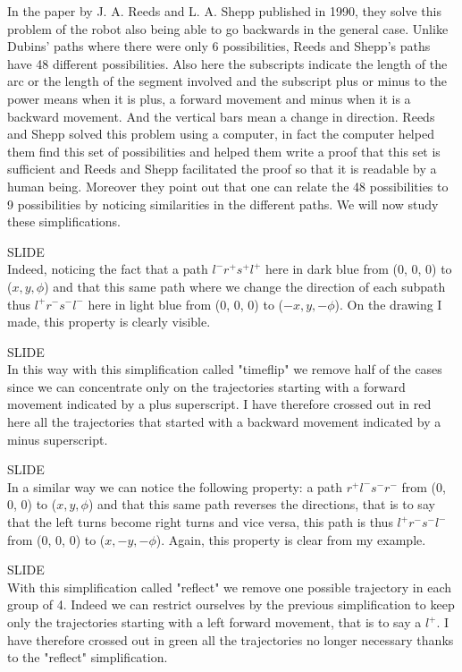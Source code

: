 \documentclass[12pt,a4paper]{article}
\newcommand{\slide}{\vspace{0.6cm}SLIDE\\}
\begin{document}
	In the paper by J. A. Reeds and L. A. Shepp published in 1990, they solve this problem of the robot also being able to go backwards in the general case. Unlike Dubins' paths where there were only 6 possibilities, Reeds and Shepp's paths have 48 different possibilities. Also here the subscripts indicate the length of the arc or the length of the segment involved and the subscript plus or minus to the power means when it is plus, a forward movement and minus when it is a backward movement. And the vertical bars mean a change in direction. Reeds and Shepp solved this problem using a computer, in fact the computer helped them find this set of possibilities and helped them write a proof that this set is sufficient and Reeds and Shepp facilitated the proof so that it is readable by a human being. Moreover they point out that one can relate the 48 possibilities to 9 possibilities by noticing similarities in the different paths. We will now study these simplifications.
	
	\slide
	
	Indeed, noticing the fact that a path $l^-r^+s^+l^+$ here in dark blue from (0, 0, 0) to ($x, y, \phi$) and that this same path where we change the direction of each subpath thus $l^+r^-s^-l^-$ here in light blue from (0, 0, 0) to ($-x,y,-\phi$). On the drawing I made, this property is clearly visible.
	
	\slide
	
	In this way with this simplification called "timeflip" we remove half of the cases since we can concentrate only on the trajectories starting with a forward movement indicated by a plus superscript. I have therefore crossed out in red here all the trajectories that started with a backward movement indicated by a minus superscript.
	
	\slide
	
	In a similar way we can notice the following property: a path $r^+l^-s^-r^-$ from (0, 0, 0) to ($x, y, \phi$) and that this same path reverses the directions, that is to say that the left turns become right turns and vice versa, this path is thus $l^+r^-s^-l^-$ from (0, 0, 0) to ($x,-y,-\phi$). Again, this property is clear from my example.
	
	\slide
	
	With this simplification called "reflect" we remove one possible trajectory in each group of 4. Indeed we can restrict ourselves by the previous simplification to keep only the trajectories starting with a left forward movement, that is to say a $l^+$. I have therefore crossed out in green all the trajectories no longer necessary thanks to the "reflect" simplification.
	
\end{document}
